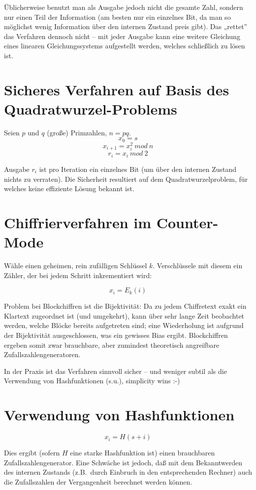 Üblicherweise benutzt man als Ausgabe jedoch nicht die gesamte Zahl, sondern nur einen Teil der Information (am besten nur ein einzelnes Bit, da man so möglichst wenig Information über den internen Zustand preis gibt). Das „rettet” das Verfahren dennoch nicht -- mit jeder Ausgabe kann eine weitere Gleichung eines linearen Gleichungssystems aufgestellt werden, welches schließlich zu lösen ist.

\section{Sicheres Verfahren auf Basis des Quadratwurzel-Problems}

Seien $p$ und $q$ (große) Primzahlen, $n=p q$.
$$x_0 = s $$
$$x_{i+1} = x_i^2\ mod\ n$$
$$r_i = x_i\ mod\ 2$$

Ausgabe $r_i$ ist pro Iteration ein einzelnes Bit (um über den internen Zustand nichts zu verraten). Die Sicherheit resultiert auf dem Quadratwurzelproblem, für welches keine effiziente Lösung bekannt ist.

\section{Chiffrierverfahren im Counter-Mode}

Wähle einen geheimen, rein zufälligen Schlüssel $k$. Verschlüssele mit diesem ein Zähler, der bei jedem Schritt inkrementiert wird:

$$x_i = E_k(i)$$

Problem bei Blockchiffren ist die Bijektivität: Da zu jedem Chiffretext exakt ein Klartext zugeordnet ist (und umgekehrt), kann über sehr lange Zeit beobachtet werden, welche Blöcke bereits aufgetreten sind; eine Wiederholung ist aufgrund der Bijektivität ausgeschlossen, was ein gewisses Bias ergibt. Blockchiffren ergeben somit zwar brauchbare, aber zumindest theoretisch angreifbare Zufallszahlengeneratoren.

In der Praxis ist das Verfahren sinnvoll sicher -- und weniger subtil als die Verwendung von Hashfunktionen (s.u.), simplicity wins :-)

\section{Verwendung von Hashfunktionen}

$$x_i = H(s+i) $$

Dies ergibt (sofern $H$ eine starke Hashfunktion ist) einen brauchbaren Zufallszahlengenerator. Eine Schwäche ist jedoch, daß mit dem Bekanntwerden des internen Zustands (z.B.~durch Einbruch in den entsprechenden Rechner) auch die Zufallszahlen der Vergangenheit berechnet werden können.

